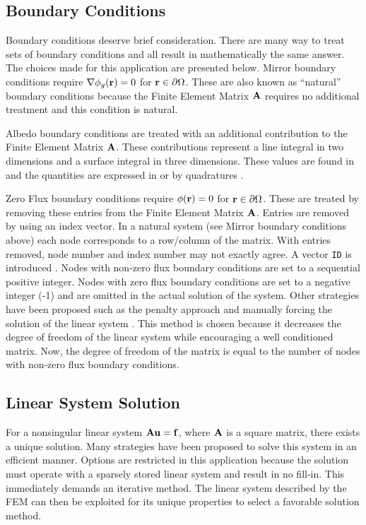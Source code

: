   \subsection{Boundary Conditions}
    Boundary conditions deserve brief consideration. There are many way to treat 
    sets of boundary conditions and all result in mathematically the same 
    answer. The choices made for this application are presented below. Mirror 
    boundary conditions require $\mathbf{\nabla} \phi_g(\mathbf{r}) = 0$ for 
    $\mathbf{r} \in \partial \Omega$. These are also known as ``natural'' boundary
    conditions because the Finite Element Matrix $\mathbf{A}$ requires no additional 
    treatment and this condition is natural.
    
    Albedo boundary conditions are treated with an additional contribution to 
    the Finite Element Matrix $\mathbf{A}$. These contributions represent a line 
    integral in two dimensions and a surface integral in three dimensions. These
    values are found in  and the quantities are 
    expressed in  or by quadratures 
    .
    
    Zero Flux boundary conditions require $\phi(\mathbf{r}) = 0$ for 
    $\mathbf{r} \in \partial \Omega$. These are treated by removing these entries from
    the Finite Element Matrix $\mathbf{A}$. Entries are removed by using an index 
    vector. In a natural system (see Mirror boundary conditions above) each node
    corresponds to a row/column of the matrix. With entries removed, node number
    and index number may not exactly agree. A vector \texttt{ID} is introduced
    \cite{textbookjohnson}. Nodes with non-zero flux boundary conditions are set
    to a sequential positive integer. Nodes with zero flux boundary conditions 
    are set to a negative integer (-1) and are omitted in the actual solution of 
    the system. Other strategies have been proposed such as the penalty approach 
    \cite{textbookhughes} and manually forcing the solution of the linear system 
    \cite{textbookli}. This method is chosen because it decreases the degree of 
    freedom of the linear system while encouraging a well conditioned matrix. 
    Now, the degree of freedom of the matrix is equal to the number of nodes 
    with non-zero flux boundary conditions.
    
  \subsection{Linear System Solution}
    For a nonsingular linear system $\mathbf{A} \mathbf{u} = \mathbf{f}$, where $\mathbf{A}$ is a square 
    matrix, there exists a unique solution. Many strategies have been proposed 
    to solve this system in an efficient manner. Options are restricted in this
    application because the solution must operate with a sparsely stored linear 
    system and result in no fill-in. This immediately demands an iterative 
    method. The linear system described by the FEM can then be exploited for its 
    unique properties to select a favorable solution method.
    
